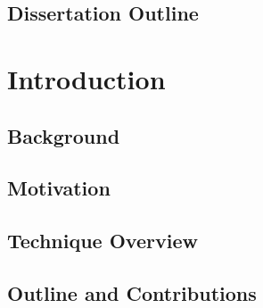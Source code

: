 \documentclass[12pt, letterpaper]{report}   %
\begin{document}
\section{Dissertation Outline}
\label{sec:intro-outline}


\clearpage





\chapter*{}

\chapter{Introduction}
\label{sec:adapt-intro}

\section{Background}
\label{sec:adapt-background}


\section{Motivation}
\label{sec:adapt-motivation}


\section{Technique Overview}
\label{sec:adapt-overview}


\section{Outline and Contributions}
\label{sec:adapt-outline}

\end{document}

